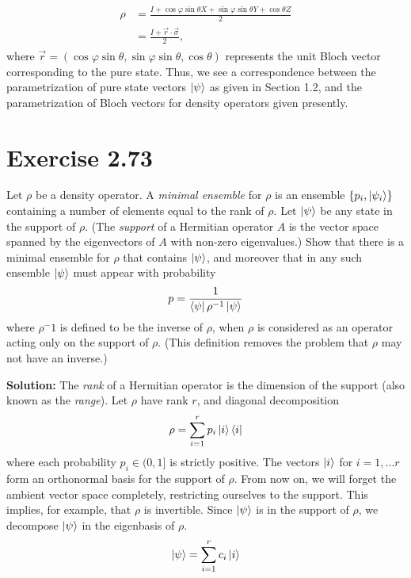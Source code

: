 \documentclass{book}
\begin{document}
    \begin{align}
    \begin{aligned}
        \rho &= \frac{I + \cos\varphi \sin\theta X + \sin\varphi\sin\theta Y + \cos\theta Z}{2} \\
        &= \frac{I + \vec{r}\cdot \vec{\sigma}}{2},
    \end{aligned}
    \end{align}
    where $\vec{r} = (\cos\varphi \sin\theta, \sin\varphi\sin\theta, \cos\theta)$ represents the unit Bloch vector corresponding to the pure state. Thus, we see a correspondence between the parametrization of pure state vectors $\ket{\psi}$ as given in Section 1.2, and the parametrization of Bloch vectors for density operators given presently.

\section*{Exercise 2.73}
    Let $\rho$ be a density operator. A \emph{minimal ensemble} for $\rho$ is an ensemble $\{p_i, \ket{\psi_i}\}$ containing a number of elements equal to the rank of $\rho$. Let $\ket{\psi}$ be any state in the support of $\rho$. (The \emph{support} of a Hermitian operator $A$ is the vector space spanned by the eigenvectors of $A$ with non-zero eigenvalues.) Show that there is a minimal ensemble for $\rho$ that contains $\ket{\psi}$, and moreover that in any such ensemble $\ket{\psi}$ must appear with probability
    \begin{align}
        p = \frac{1}{\bra{\psi}\rho^{-1} \ket{\psi}}
    \end{align}
    where $\rho^-1$ is defined to be the inverse of $\rho$, when $\rho$ is considered as an operator acting only on the support of $\rho$. (This definition removes the problem that $\rho$ may not have an inverse.)

    \textbf{Solution:} The \emph{rank} of a Hermitian operator is the dimension of the support (also known as the \emph{range}). Let $\rho$ have rank $r$, and diagonal decomposition
    \begin{align}
        \rho = \sum_{i=1}^r p_i \ket{i}\bra{i}
    \end{align}
    where each probability $p_i \in (0,1]$ is strictly positive. The vectors $\ket{i}$ for $i = 1,\dots r$ form an orthonormal basis for the support of $\rho$. From now on, we will forget the ambient vector space completely, restricting ourselves to the support. This implies, for example, that $\rho$ is invertible. Since $\ket{\psi}$ is in the support of $\rho$, we decompose $\ket{\psi}$ in the eigenbasis of $\rho$.
    \begin{align} \label{eq:2.73_basis}
        \ket{\psi} = \sum_{i=1}^r c_i \ket{i}
    \end{align}
\end{document}
